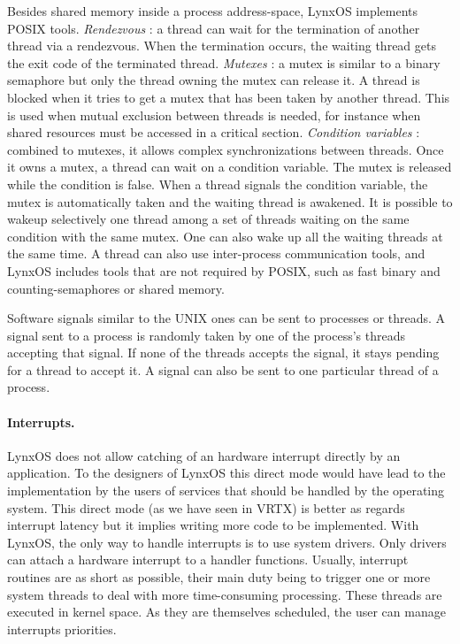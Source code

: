 \documentclass[10pt]{report}
\begin{document}
Besides shared memory inside a process address-space, LynxOS implements POSIX tools. {\em Rendezvous} : a thread can wait
for the termination of another thread via a rendezvous. When the termination occurs, the waiting thread gets the exit code of the
terminated thread. {\em Mutexes} : a mutex is similar to a binary semaphore but only the thread owning the mutex can release it.
A thread is blocked when it tries to get a mutex that has been taken by another thread. This is used when mutual exclusion between threads
is needed, for instance when shared resources must be accessed in a critical section. {\em Condition variables} : combined to mutexes,
it allows complex synchronizations between threads. Once it owns a mutex, a thread can wait on a condition variable. The mutex is released
while the condition is false. When a thread signals the condition variable, the mutex is automatically taken and the waiting thread is
awakened. It is possible to wakeup selectively one thread among a set of threads waiting on the same condition with the same mutex. One can also
wake up all the waiting threads at the same time. A thread can also use inter-process communication tools, and LynxOS includes tools that
are not required by POSIX, such as fast binary and counting-semaphores or shared memory.

Software signals similar to the UNIX ones can be sent to processes or threads. A signal sent to a process is randomly taken by one of the
process's threads accepting that signal. If none of the threads accepts the signal, it stays pending for a thread to accept it. A signal can also
be sent to one particular thread of a process.

\paragraph{Interrupts.} LynxOS does not allow catching of an hardware interrupt directly by an application. To the designers of LynxOS 
this direct mode would have lead to the implementation by the users of services that should be handled by the operating system. 
This direct mode (as we have seen in VRTX) is better as regards interrupt latency but it implies writing more code to be implemented. 
With LynxOS, the only way to handle interrupts is to use system drivers. Only drivers can attach a hardware interrupt to a handler functions. 
Usually, interrupt routines are as short as possible, their main duty being to trigger one or more system threads to deal with more 
time-consuming processing. These threads are executed in kernel space. As they are themselves scheduled, the user can manage interrupts 
priorities.
\end{document}
